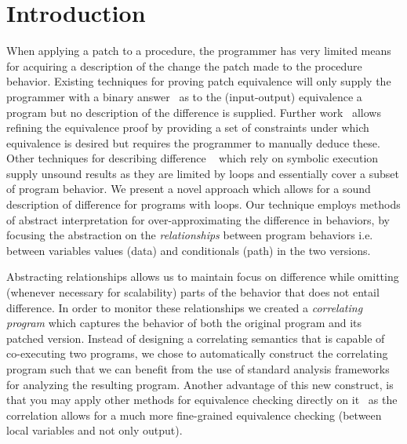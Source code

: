 \section{Introduction} 



When applying a patch to a procedure, the programmer has very limited means
for acquiring a description of the change the patch made to the procedure
behavior. Existing techniques for proving patch equivalence will only supply
the programmer with a binary answer~\cite{GodlinStrichman} as to the
(input-output) equivalence a program but no description of the difference is
supplied. Further work~\cite{KawaguchiLahiriRebelo10} allows refining the
equivalence proof by providing a set of constraints under which equivalence
is desired but requires the programmer to manually deduce these. Other
techniques for describing difference
~\cite{DwyerElbaumPerson08,HawblitzelKawaguchiLahiriRebelo12} which rely on
symbolic execution supply unsound results as they are limited by loops and
essentially cover a subset of program behavior. We present a novel approach
which allows for a sound description of difference for programs with loops.
Our technique employs methods of abstract interpretation for
over-approximating the difference in behaviors, by focusing the abstraction
on the \emph{relationships} between program behaviors i.e. between variables
values (data) and conditionals (path) in the two versions.

Abstracting relationships allows us to maintain focus on difference while
omitting (whenever necessary for scalability) parts of the behavior that does
not entail difference. In order to monitor these relationships we created a
\emph{correlating program} which captures the behavior of both the original
program and its patched version. Instead of designing a correlating semantics
that is capable of co-executing two programs, we chose to automatically
construct the correlating program such that we can benefit from the use of
standard analysis frameworks for analyzing the resulting program. Another
advantage of this new construct, is that you may apply other methods for
equivalence checking directly on it~\cite{EnglerRamos11} as the correlation
allows for a much more fine-grained equivalence checking (between local
variables and not only output).

